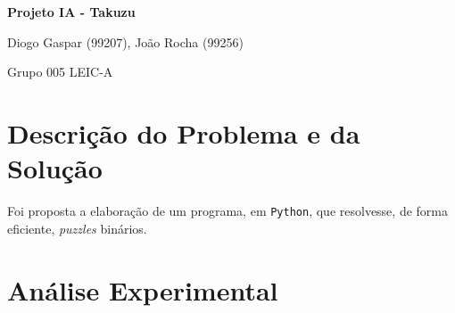 \documentclass[12pt,a4paper]{article}
\begin{document}
  \begin{titlepage}
    \begin{center}
      \vspace*{5cm}

      \Huge
      \textbf{Projeto IA - Takuzu}

      \vspace{0.5cm}

      \LARGE
      Diogo Gaspar (99207), João Rocha (99256)

      \vspace{0.5cm}
      \Large
      Grupo 005 LEIC-A

      \vfill
    \end{center}
  \end{titlepage}

  \section*{Descrição do Problema e da Solução}

  Foi proposta a elaboração de um programa, em \texttt{Python}, que resolvesse,
  de forma eficiente, \textit{puzzles} binários.

  \section*{Análise Experimental}
  
\end{document}
